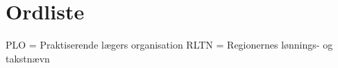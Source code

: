 








\section{Ordliste}
PLO = Praktiserende lægers organisation
RLTN =  Regionernes lønnings- og takstnævn